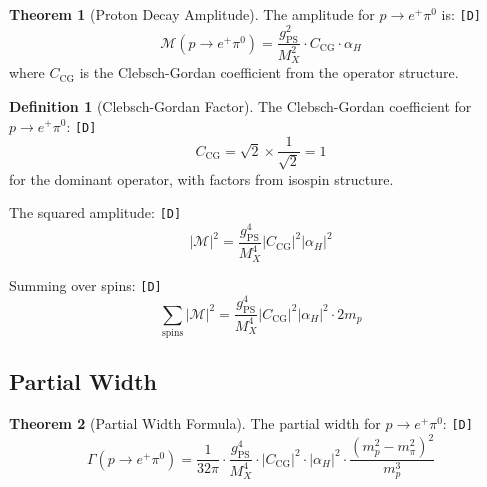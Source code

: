 \documentclass[11pt,a4paper]{article}
\newcommand{\tagD}{\textcolor{green!50!black}{\texttt{[D]}}}
\theoremstyle{definition}
\newtheorem{definition}{Definition}[section]
\newtheorem{theorem}{Theorem}[section]
\begin{document}
\begin{theorem}[Proton Decay Amplitude]
\label{thm:amplitude}
The amplitude for $p \to e^+ \pi^0$ is: \tagD{}
\begin{equation}
\label{eq:amplitude}
\boxed{\mathcal{M}(p \to e^+ \pi^0) = \frac{g_{\text{PS}}^2}{M_X^2} \cdot C_{\text{CG}} \cdot \alpha_H}
\end{equation}
where $C_{\text{CG}}$ is the Clebsch-Gordan coefficient from the operator structure.
\end{theorem}

\begin{definition}[Clebsch-Gordan Factor]
\label{def:clebsch}
The Clebsch-Gordan coefficient for $p \to e^+ \pi^0$: \tagD{}
\begin{equation}
\label{eq:clebsch}
C_{\text{CG}} = \sqrt{2} \times \frac{1}{\sqrt{2}} = 1
\end{equation}
for the dominant operator, with factors from isospin structure.
\end{definition}

The squared amplitude: \tagD{}
\begin{equation}
\label{eq:amplitude-squared}
|\mathcal{M}|^2 = \frac{g_{\text{PS}}^4}{M_X^4} |C_{\text{CG}}|^2 |\alpha_H|^2
\end{equation}

Summing over spins: \tagD{}
\begin{equation}
\label{eq:spin-sum}
\sum_{\text{spins}} |\mathcal{M}|^2 = \frac{g_{\text{PS}}^4}{M_X^4} |C_{\text{CG}}|^2 |\alpha_H|^2 \cdot 2m_p
\end{equation}

\subsection{Partial Width}
\label{subsec:partial-width}

\begin{theorem}[Partial Width Formula]
\label{thm:partial-width}
The partial width for $p \to e^+ \pi^0$: \tagD{}
\begin{equation}
\label{eq:partial-width}
\boxed{\Gamma(p \to e^+ \pi^0) = \frac{1}{32\pi} \cdot
\frac{g_{\text{PS}}^4}{M_X^4} \cdot |C_{\text{CG}}|^2 \cdot |\alpha_H|^2 \cdot
\frac{(m_p^2 - m_{\pi}^2)^2}{m_p^3}}
\end{equation}
\end{theorem}
\end{document}
